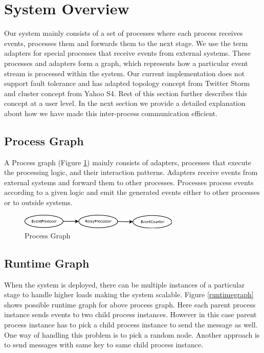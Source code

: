 \section{System Overview}
Our system mainly consists of a set of processes where each process receives events, processes them and forwards them to the next stage. We use the term adapters for special processes that receive events from external systems. These processes and adapters form a graph, which represents how a particular event stream is processed within the system. Our current implementation does not support fault tolerance and has adapted topology concept from Twitter Storm \cite{twitterStorm} and cluster concept from Yahoo S4\cite{neumeyer2010s4}. Rest of this section further describes this concept at a user level. In the next section we provide a detailed explanation about how we have made this inter-process communication efficient. 
\subsection{Process Graph}
A Process graph (Figure \ref{processgraph}) mainly consists of adapters, processes that execute the processing logic, and their interaction patterns. Adapters receive events from external systems and forward them to other processes. Processes process events according to a given logic and emit the generated events either to other processes or to outside systems. 

\begin{figure}[!t]
	\centering
	\includegraphics[width=3.0in]{processgraph.png}
	\caption{Process Graph}
	\label{processgraph}
\end{figure}

\subsection{Runtime Graph}
When the system is deployed, there can be multiple instances of a particular stage to handle higher loads making the system scalable. Figure \ref{runtimegraph} shows possible runtime graph for above process graph. Here each parent process instance sends events to two child process instances. However in this case parent process instance has to pick a child process instance to send the message as well. One way of handling this problem is to pick a random node. Another approach is to send messages with same key to same child process instance. 

